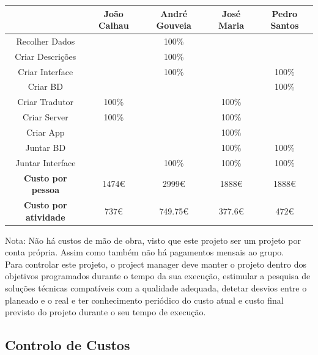 \documentclass[a4paper]{article}
\begin{document}
\begin{table}[!ht]
    \begin{tabular}{|c|c|c|c|c|}
    \hline
    ~                   & João Calhau & André Gouveia & José Maria & Pedro Santos \\ \hline
    Recolher Dados      & ~           & 100\%         & ~          & ~            \\ \hline
    Criar Descrições    & ~           & 100\%         & ~          & ~            \\ \hline
    Criar Interface     & ~           & 100\%         & ~          & 100\%        \\ \hline
    Criar BD            & ~           & ~             & ~          & 100\%        \\ \hline
    Criar Tradutor      & 100\%       & ~             & 100\%      & ~            \\ \hline
    Criar Server        & 100\%       & ~             & 100\%      & ~            \\ \hline
    Criar App           & ~           & ~             & 100\%      & ~            \\ \hline
    Juntar BD           & ~           & ~             & 100\%      & 100\%        \\ \hline
    Juntar Interface    & ~           & 100\%         & 100\%      & 100\%        \\ \hline
    \hline
    \textbf{Custo por pessoa}    & 1474\euro   & 2999\euro     & 1888\euro  & 1888\euro    \\ \hline
    \textbf{Custo por atividade} & 737\euro    & 749.75\euro   & 377.6\euro & 472\euro     \\ \hline
    \end{tabular}
\end{table}

Nota: Não há custos de mão de obra, visto que este projeto ser um projeto por conta própria. Assim como também não há pagamentos mensais ao grupo.\\

Para controlar este projeto, o project manager deve manter o projeto dentro dos objetivos programados durante o tempo da sua execução, estimular a pesquisa de soluções técnicas compatíveis com a qualidade adequada, detetar desvios entre o planeado e o real e ter conhecimento periódico do custo atual e custo final previsto do projeto durante o seu tempo de execução. 

\subsection{Controlo de Custos}
\end{document}
